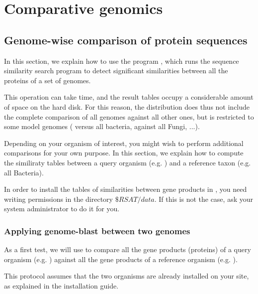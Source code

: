 \chapter{Comparative genomics}

\section{Genome-wise comparison of protein sequences}
\label{genome_blast}

In this section, we explain how to use the program
, which runs the sequence similarity search
program  to detect significant similarities between all
the proteins of a set of genomes. 

This operation can take time, and the result tables occupy a
considerable amount of space on the hard disk. For this reason, the
\RSAT distribution does thus not include the complete comparison of
all genomes against all other ones, but is restricted to some model
genomes ( versus all bacteria,
 against all Fungi, ...). 

Depending on your organism of interest, you might wish to perform
additional comparisons for your own purpose. In this section, we
explain how to compute the similiraty tables between a query organism
(e.g. ) and a reference taxon (e.g. all
Bacteria).

In order to install the tables of similarities between gene products
in \RSAT, you need writing permissions in the directory
$\$RSAT/data$. If this is not the case, ask your system administrator
to do it for you.


\subsection{Applying genome-blast between two genomes}

As a first test, we will use  to compare all the
gene products (proteins) of a query organism (e.g. ) against all the gene products of a reference organism
(e.g. ).

This protocol assumes that the two organisms are already installed on
your \RSAT site, as explained in the installation guide.

